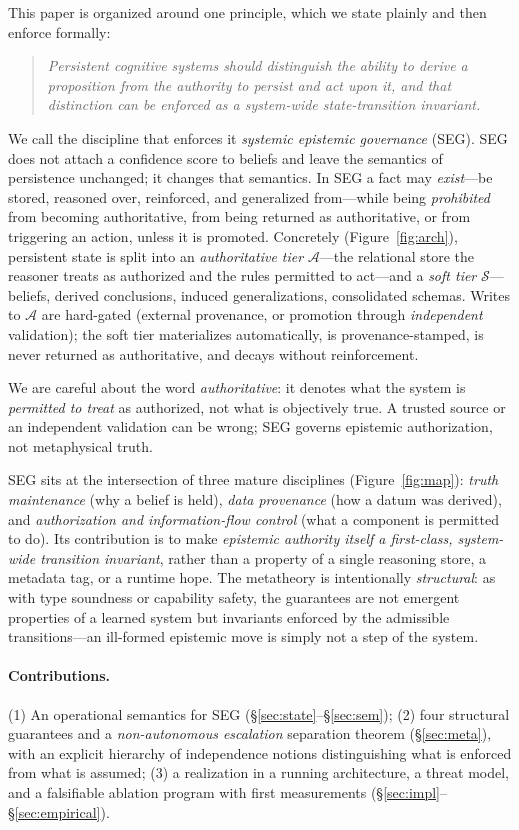 \documentclass[11pt]{article}
\theoremstyle{plain}
\theoremstyle{definition}
\newcommand{\Aut}{\mathcal{A}}
\newcommand{\Soft}{\mathcal{S}}
\begin{document}
This paper is organized around one principle, which we state plainly and then
enforce formally:
\begin{quote}\itshape
Persistent cognitive systems should distinguish the ability to \emph{derive} a
proposition from the \emph{authority} to persist and act upon it, and that
distinction can be enforced as a system-wide state-transition invariant.
\end{quote}
We call the discipline that enforces it \emph{systemic epistemic governance}
(SEG). SEG does not attach a confidence score to beliefs and leave the semantics
of persistence unchanged; it changes that semantics. In SEG a fact may
\emph{exist}---be stored, reasoned over, reinforced, and generalized from---while
being \emph{prohibited} from becoming authoritative, from being returned as
authoritative, or from triggering an action, unless it is promoted. Concretely
(Figure~\ref{fig:arch}), persistent state is split into an \emph{authoritative
tier} $\Aut$---the relational store the reasoner treats as authorized and the
rules permitted to act---and a \emph{soft tier} $\Soft$---beliefs, derived
conclusions, induced generalizations, consolidated schemas. Writes to $\Aut$ are
hard-gated (external provenance, or promotion through \emph{independent}
validation); the soft tier materializes automatically, is provenance-stamped, is
never returned as authoritative, and decays without reinforcement.

We are careful about the word \emph{authoritative}: it denotes what the system is
\emph{permitted to treat} as authorized, not what is objectively true. A trusted
source or an independent validation can be wrong; SEG governs epistemic
authorization, not metaphysical truth.

SEG sits at the intersection of three mature disciplines
(Figure~\ref{fig:map}): \emph{truth maintenance} (why a belief is held),
\emph{data provenance} (how a datum was derived), and \emph{authorization and
information-flow control} (what a component is permitted to do). Its contribution
is to make \emph{epistemic authority itself a first-class, system-wide transition
invariant}, rather than a property of a single reasoning store, a metadata tag,
or a runtime hope. The metatheory is intentionally \emph{structural}: as with
type soundness or capability safety, the guarantees are not emergent properties
of a learned system but invariants enforced by the admissible transitions---an
ill-formed epistemic move is simply not a step of the system.

\paragraph{Contributions.}
(1) An operational semantics for SEG (\S\ref{sec:state}--\S\ref{sec:sem});
(2) four structural guarantees and a \emph{non-autonomous escalation} separation
theorem (\S\ref{sec:meta}), with an explicit hierarchy of independence notions
distinguishing what is enforced from what is assumed;
(3) a realization in a running architecture, a threat model, and a falsifiable
ablation program with first measurements (\S\ref{sec:impl}--\S\ref{sec:empirical}).
\end{document}
